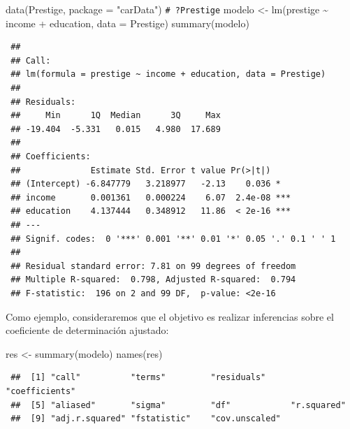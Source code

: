\documentclass[
  10pt,
]{book}
\newenvironment{Shaded}{\begin{snugshade}}{\end{snugshade}}
\newcommand{\AttributeTok}[1]{\textcolor[rgb]{0.77,0.63,0.00}{#1}}
\newcommand{\CommentTok}[1]{\textcolor[rgb]{0.56,0.35,0.01}{\textit{#1}}}
\newcommand{\FunctionTok}[1]{\textcolor[rgb]{0.00,0.00,0.00}{#1}}
\newcommand{\NormalTok}[1]{#1}
\newcommand{\OtherTok}[1]{\textcolor[rgb]{0.56,0.35,0.01}{#1}}
\newcommand{\SpecialCharTok}[1]{\textcolor[rgb]{0.00,0.00,0.00}{#1}}
\newcommand{\StringTok}[1]{\textcolor[rgb]{0.31,0.60,0.02}{#1}}
\theoremstyle{break}
\theoremstyle{nonumberplain}
\renewcommand{\CommentTok}[1]{\textcolor[rgb]{0.41,0.41,0.41}{\texttt{#1}}}
\begin{document}
\begin{Shaded}
\begin{Highlighting}[]
\FunctionTok{data}\NormalTok{(Prestige, }\AttributeTok{package =} \StringTok{"carData"}\NormalTok{)}
\CommentTok{\# ?Prestige}
\NormalTok{modelo }\OtherTok{\textless{}{-}} \FunctionTok{lm}\NormalTok{(prestige }\SpecialCharTok{\textasciitilde{}}\NormalTok{ income }\SpecialCharTok{+}\NormalTok{ education, }\AttributeTok{data =}\NormalTok{ Prestige)}
\FunctionTok{summary}\NormalTok{(modelo)}
\end{Highlighting}
\end{Shaded}

\begin{verbatim}
 ## 
 ## Call:
 ## lm(formula = prestige ~ income + education, data = Prestige)
 ## 
 ## Residuals:
 ##     Min      1Q  Median      3Q     Max 
 ## -19.404  -5.331   0.015   4.980  17.689 
 ## 
 ## Coefficients:
 ##              Estimate Std. Error t value Pr(>|t|)    
 ## (Intercept) -6.847779   3.218977   -2.13    0.036 *  
 ## income       0.001361   0.000224    6.07  2.4e-08 ***
 ## education    4.137444   0.348912   11.86  < 2e-16 ***
 ## ---
 ## Signif. codes:  0 '***' 0.001 '**' 0.01 '*' 0.05 '.' 0.1 ' ' 1
 ## 
 ## Residual standard error: 7.81 on 99 degrees of freedom
 ## Multiple R-squared:  0.798, Adjusted R-squared:  0.794 
 ## F-statistic:  196 on 2 and 99 DF,  p-value: <2e-16
\end{verbatim}

Como ejemplo, consideraremos que el objetivo es realizar inferencias sobre el coeficiente de determinación ajustado:

\begin{Shaded}
\begin{Highlighting}[]
\NormalTok{res }\OtherTok{\textless{}{-}} \FunctionTok{summary}\NormalTok{(modelo)}
\FunctionTok{names}\NormalTok{(res)}
\end{Highlighting}
\end{Shaded}

\begin{verbatim}
 ##  [1] "call"          "terms"         "residuals"     "coefficients" 
 ##  [5] "aliased"       "sigma"         "df"            "r.squared"    
 ##  [9] "adj.r.squared" "fstatistic"    "cov.unscaled"
\end{verbatim}

\begin{Shaded}
\end{Shaded}
\end{document}
